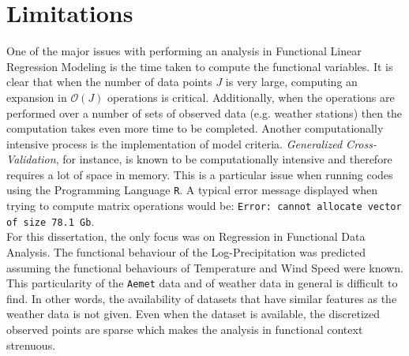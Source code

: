 
\section{Limitations}
One of the major issues with performing an analysis in Functional Linear Regression Modeling is the time taken to compute the functional variables. It is clear that when the number of data points $J$ is very large, computing an expansion in $\mathcal{O}(J)$ operations is critical. Additionally, when the operations are performed over a number of sets of observed data (e.g. weather stations) then the computation takes even more time to be completed. Another computationally intensive process is the implementation of model criteria. \textit{Generalized Cross-Validation}, for instance, is known to be computationally intensive and therefore requires a lot of space in memory. This is a particular issue when running codes using the Programming Language \texttt{R}. A typical error message displayed when trying to compute matrix operations would be: \texttt{Error: cannot allocate vector of size 78.1 Gb}.\\
For this dissertation, the only focus was on Regression in Functional Data Analysis. The functional behaviour of the Log-Precipitation was predicted assuming the functional behaviours of Temperature and Wind Speed were known. This particularity of the \texttt{Aemet} data and of weather data in general is difficult to find. In other words, the availability of datasets that have similar features as the weather data is not given. Even when the dataset is available, the discretized observed points are sparse which makes the analysis in functional context strenuous.



